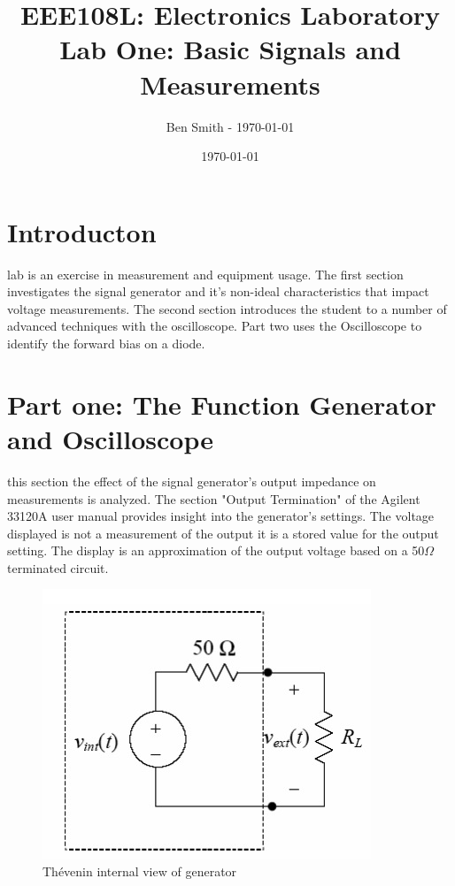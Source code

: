 \documentclass[11pt,journal]{IEEEtran}
\begin{document}
\title{EEE108L: Electronics Laboratory \\
	Lab One: Basic Signals and Measurements}
\author{Ben Smith - \today}
\date{\today}
\maketitle

\section{Introducton}
	 lab is an exercise in measurement and equipment usage. The first section investigates 
	the signal generator and it's non-ideal characteristics that impact voltage measurements. The second section introduces the student
	to a number of advanced techniques with the oscilloscope. Part two uses the Oscilloscope to identify the forward bias on a diode.

\section{Part one: The Function Generator and Oscilloscope}
	
	 this section the effect of the signal generator's output impedance on measurements is analyzed. The section "Output Termination"	
	of the Agilent 33120A user manual provides insight into the generator's settings. The voltage displayed is not a measurement of the
	output it is a stored value for the output setting. The display is an approximation of the output voltage based on a 50$\Omega$ terminated circuit.
	\begin{figure}
		\centering
		\includegraphics[width=.25\textwidth]{screenshot_22}
		\caption{Thévenin internal view of generator\cite{2}} 
	\end{figure}
	
\end{document}
